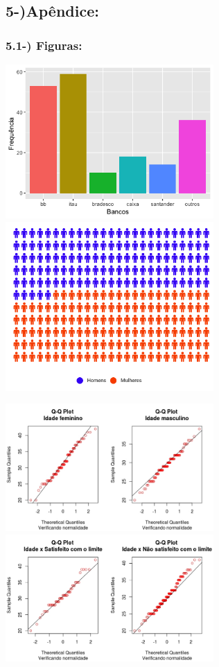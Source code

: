 \documentclass[]{article}
\begin{document}
\subsection{5-)Apêndice:}\label{apendice}

\subsubsection{5.1-) Figuras:}\label{figuras}

\includegraphics[width=3.12500in]{Bancos.png}
\includegraphics[width=3.12500in]{pictograma.png}

\includegraphics[width=3.12500in]{QQ Plot idade genero.jpeg}
\includegraphics[width=3.12500in]{QQplot Idade x Lim.jpeg}
\end{document}
